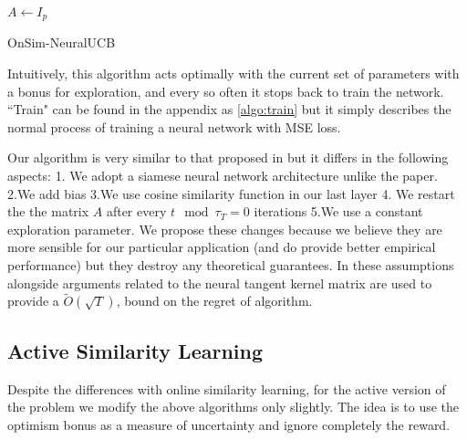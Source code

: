 \documentclass{article}
\begin{document}
\begin{algorithm}
    $A \gets I_{p}$\;
    \caption{OnSim-NeuralUCB}\label{algo:onsim-neuralucb}
  \end{algorithm}
Intuitively, this algorithm acts optimally with the current set of parameters with a bonus for exploration, and every so often it stops back to train the network.
``Train" can be found in the appendix as \ref{algo:train} but it simply describes the normal process of training a neural network with MSE loss.

Our algorithm is very similar to that proposed in \cite{neuralucb} but it differs in the following aspects: 1. We adopt a siamese neural network architecture unlike the paper.
2.We add bias 3.We use cosine similarity function in our last layer 4. We restart the the matrix $A$ after every $t \mod \tau_T = 0$ iterations 5.We use a constant exploration parameter.
We propose these changes because we believe they are more sensible for our particular application (and do provide better empirical performance) but they destroy any theoretical guarantees.
In \cite{neuralucb} these assumptions alongside arguments related to the  neural tangent kernel matrix \cite{neuraltangentkernel} are used to provide a $\tilde{O}(\sqrt{T})$, bound on the regret of algorithm.


  \subsection{Active Similarity Learning}
  Despite the differences with online similarity learning, for the active version of the problem we modify the above algorithms only slightly.
  The idea is to use the optimism bonus as a measure of uncertainty and ignore completely the reward.
\end{document}
